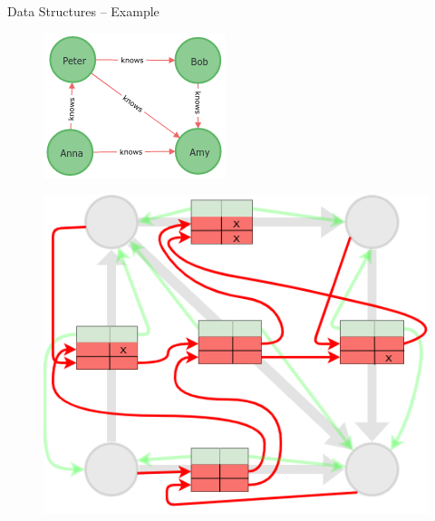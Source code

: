 \documentclass[rgb]{beamer}
\begin{document}
        \begin{frame}[fragile]{Data Structures -- Example}
            \begin{figure}
                \begin{center}
                \includegraphics[keepaspectratio, height=0.4\textheight, width=.4\textwidth]{img/graph.png}
                \end{center}
            \end{figure}
            \end{frame}
            
            \begin{frame}
            \begin{figure}
                \begin{center}
                \includegraphics[keepaspectratio, height=\textheight, width=\textwidth]{img/example_structs.png}
                \end{center}
            \end{figure}
        \end{frame}
    
\end{document}
